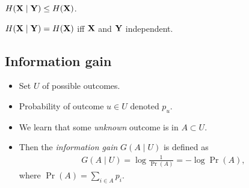 \begin{frame}
  \begin{corollary}
    \(H(\mathbf X\mid \mathbf Y) \leq H(\mathbf X)\).
  \end{corollary}

  \begin{corollary}
    \(H(\mathbf X\mid \mathbf Y) = H(\mathbf X)\) iff \(\mathbf X\) and \(\mathbf 
      Y\) independent.
  \end{corollary}
\end{frame}
%
%

\subsection{Information gain}

\begin{frame}
  \begin{definition}
    \begin{itemize}
      \item Set \(U\) of possible outcomes.
      \item Probability of outcome \(u\in U\) denoted \(p_u\).
      \item We learn that some \emph{unknown} outcome is in \(A\subset U\).
      \item Then the \emph{information gain} \(G(A\mid U)\) is defined as
        \begin{align*}
          G(A\mid U) = \log\frac{1}{\Pr(A)} = -\log\Pr(A),
        \end{align*}
        where \(\Pr(A) = \sum_{i\in A} p_i\).
    \end{itemize}
  \end{definition}
\end{frame}

